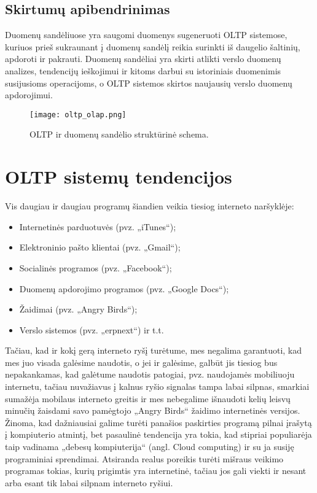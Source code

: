 \documentclass[12pt,a4paper,titlepage]{article}
\begin{document}
\subsection{Skirtumų apibendrinimas}

Duomenų sandėliuose yra saugomi duomenys sugeneruoti OLTP sistemose, kuriuos prieš sukraunant į duomenų sandėlį reikia surinkti iš daugelio šaltinių, apdoroti ir pakrauti. Duomenų sandėliai yra skirti atlikti verslo duomenų analizes, tendencijų ieškojimui ir kitoms darbui su istoriniais duomenimis susijusioms operacijoms, o OLTP sistemos skirtos naujausių verslo duomenų apdorojimui.

\begin{figure}[htb]
\begin{center}
\leavevmode
\texttt{[image: oltp\_olap.png]}
\end{center}
\caption{OLTP ir duomenų sandėlio struktūrinė schema.}
\label{fig:awesome_image}
\end{figure}

\newpage

\section{OLTP sistemų tendencijos}

Vis daugiau ir daugiau programų šiandien veikia tiesiog interneto naršyklėje:
\begin{itemize}
  \item Internetinės parduotuvės (pvz. „iTunes“);
  \item Elektroninio pašto klientai (pvz. „Gmail“);
  \item Socialinės programos (pvz. „Facebook“);
  \item Duomenų apdorojimo programos (pvz. „Google Docs“);
  \item Žaidimai (pvz. „Angry Birds“);
  \item Verslo sistemos (pvz. „erpnext“) ir t.t.
\end{itemize}

Tačiau, kad ir kokį gerą interneto ryšį turėtume, mes negalima garantuoti, kad mes juo visada galėsime naudotis, o jei ir galėsime, galbūt jis tiesiog bus nepakankamas, kad galėtume naudotis patogiai, pvz. naudojamės mobiliuoju internetu, tačiau nuvažiavus į kalnus ryšio signalas tampa labai silpnas, smarkiai sumažėja mobilaus interneto greitis ir mes nebegalime išnaudoti kelių leisvų minučių žaisdami savo pamėgtojo „Angry Birds“ žaidimo internetinės versijos. Žinoma, kad dažniausiai galime turėti panašios paskirties programą pilnai įrašytą į kompiuterio atmintį, bet pasaulinė tendencija yra tokia, kad stipriai populiarėja taip vadinama „debesų kompiuterija“ (angl. Cloud computing) ir su ja susiję programiniai sprendimai. Atsiranda realus poreikis turėti mišraus veikimo programas tokias, kurių prigimtis yra internetinė, tačiau jos gali viekti ir nesant arba esant tik labai silpnam interneto ryšiui. 
\end{document}
